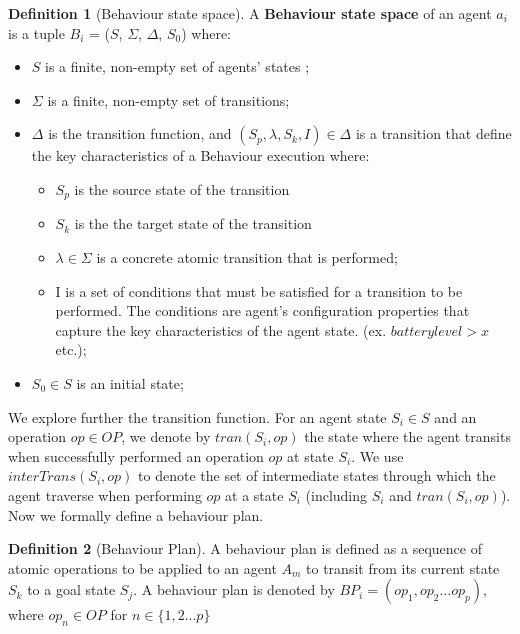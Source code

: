 \documentclass[journal]{IEEEtran}
\theoremstyle{definition}
\newtheorem{definition}{Definition}
\begin{document}
\begin{definition}[Behaviour state space]
A \textbf{Behaviour state space} of an agent $a_i$ is a tuple $B_i$ = ($S$, $\Sigma$, $\Delta $, $S_{0}$)  where: 
\begin{itemize}
\item $S$ is a finite, non-empty set of agents' states ;
\item $\Sigma$ is a finite, non-empty set of transitions;
\item $ \Delta $ is the transition function,
and $(S_p,\lambda,S_k,I) \in \Delta $ is a transition
that define the key characteristics of a Behaviour execution
where:
\begin{itemize}
\item  $S_p$ is the source state of the transition
\item  $S_k$ is the the target state of the transition
\item  $\lambda \in \Sigma$ is a concrete atomic transition that is performed;
\item I is a set of conditions that must be satisfied for a transition to be performed. The conditions are agent's configuration properties that capture the key characteristics of the agent state.
(ex. $battery level > x$ etc.);
\end{itemize}
\item $S_{0} \in S$ is an initial state;
\end{itemize}
\end{definition}


We explore further the transition function. 
For an agent state $S_i \in S$ and an operation $ op \in  OP$, we denote by $tran(S_i,op )$ the state where the agent transits when successfully performed an operation $ op $ at state $S_i$. We use $ interTrans(S_i,op) $ to denote the set of intermediate states through which the agent traverse when performing $ op $ at a state $S_i$ (including $S_i$ and $tran(S_i,op)$). 
Now we formally define a behaviour plan.

\begin{definition}[Behaviour Plan]  A behaviour plan is defined as a sequence of atomic operations to be applied to an agent $A_m$ to transit from its current state $S_k$ to a goal state $S_j$.  A behaviour plan is denoted by $BP_i= (op_1, op_2 ... op_p)$, where $op_n \in OP $ for $ n \in \{1,2 ... p\} $
\end{definition}
\end{document}
